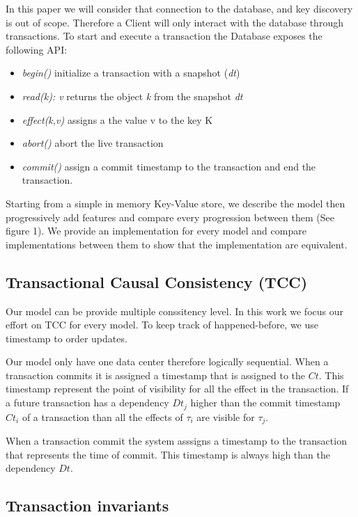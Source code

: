 \documentclass[parallelisme]{compas2022}
\begin{document}
In this paper we will consider that connection to the database, and key discovery is out of scope.
Therefore a Client will only interact with the database through transactions.
To start and execute a transaction the Database exposes the following API:
\begin{itemize}
\item \emph{begin()} initialize a transaction with a snapshot (\emph{dt})
\item \emph{read(k): v} returns the object \emph{k} from the snapshot \emph{dt}
\item \emph{effect(k,v)} assigns a the value v to the key K
\item \emph{abort()} abort the live transaction
\item \emph{commit()} assign a commit timestamp to the transaction and end the transaction.
\end{itemize}

Starting from a simple in memory Key-Value store, we describe the model then progressively add features and compare every progression between them (See figure 1).
We provide an implementation for every model and compare implementations between them to show that the implementation are equivalent.

\subsection{Transactional Causal Consistency (TCC)}

Our model can be provide multiple conssitency level.
In this work we focus our effort on TCC for every model.
To keep track of happened-before, we use timestamp to order updates.

Our model only have one data center therefore logically sequential.
When a transaction commits it is assigned a timestamp that is assigned to the $Ct$.
This timestamp represent the point of visibility for all the effect in the transaction.
If a future transaction has a dependency $Dt_j$ higher than the commit timestamp $Ct_i$ of a transaction than all the effects of $\tau_i$ are visible for $\tau_j$.

When a transaction commit the system asssigns a timestamp to the transaction that represents the time of commit.
This timestamp is always high than the dependency $Dt$.


\subsection{Transaction invariants}
\end{document}
